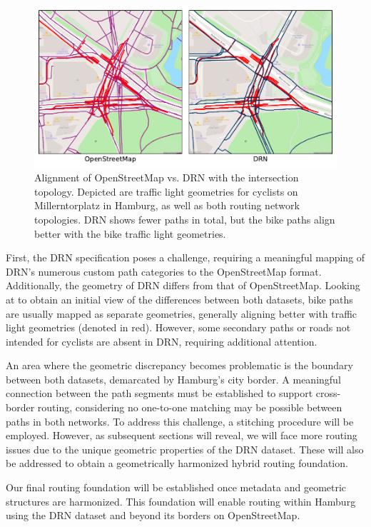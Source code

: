 \begin{figure}[t]
\centering
\includegraphics[width=\linewidth]{images/routing-drn-osm-intersection.pdf}
\caption{Alignment of OpenStreetMap vs. DRN with the intersection topology. Depicted are traffic light geometries for cyclists on Millerntorplatz in Hamburg, as well as both routing network topologies. DRN shows fewer paths in total, but the bike paths align better with the bike traffic light geometries.}
\label{fig:comparison}
\end{figure}

First, the DRN specification poses a challenge, requiring a meaningful mapping of DRN's numerous custom path categories to the OpenStreetMap format. Additionally, the geometry of DRN differs from that of OpenStreetMap. Looking at  to obtain an initial view of the differences between both datasets, bike paths are usually mapped as separate geometries, generally aligning better with traffic light geometries (denoted in red). However, some secondary paths or roads not intended for cyclists are absent in DRN, requiring additional attention.

An area where the geometric discrepancy becomes problematic is the boundary between both datasets, demarcated by Hamburg's city border. A meaningful connection between the path segments must be established to support cross-border routing, considering no one-to-one matching may be possible between paths in both networks. To address this challenge, a stitching procedure will be employed. However, as subsequent sections will reveal, we will face more routing issues due to the unique geometric properties of the DRN dataset. These will also be addressed to obtain a geometrically harmonized hybrid routing foundation. 

Our final routing foundation will be established once metadata and geometric structures are harmonized. This foundation will enable routing within Hamburg using the DRN dataset and beyond its borders on OpenStreetMap.

